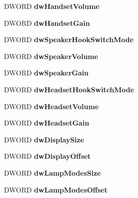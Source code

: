 \begin{DoxyCompactItemize}
D\+W\+O\+RD {\bfseries dw\+Handset\+Volume}
\item 
\mbox{\label{structphonestatus__tag_a398c042812e9722614f518389cfb1e4d}} 
D\+W\+O\+RD {\bfseries dw\+Handset\+Gain}
\item 
\mbox{\label{structphonestatus__tag_a8dbb08eea58c81497d66b5f3d90ec59e}} 
D\+W\+O\+RD {\bfseries dw\+Speaker\+Hook\+Switch\+Mode}
\item 
\mbox{\label{structphonestatus__tag_acf8f261d6d6ee2c2eb272dd4335f390e}} 
D\+W\+O\+RD {\bfseries dw\+Speaker\+Volume}
\item 
\mbox{\label{structphonestatus__tag_aad9ad6ed831f084a2406aa2b0258c2d7}} 
D\+W\+O\+RD {\bfseries dw\+Speaker\+Gain}
\item 
\mbox{\label{structphonestatus__tag_a511fd2e99c6505e14d71962ab4705394}} 
D\+W\+O\+RD {\bfseries dw\+Headset\+Hook\+Switch\+Mode}
\item 
\mbox{\label{structphonestatus__tag_a80bb2c56500c2ea165642dc061b9ac4a}} 
D\+W\+O\+RD {\bfseries dw\+Headset\+Volume}
\item 
\mbox{\label{structphonestatus__tag_a43a1f6471e398787caf1aee107c5b047}} 
D\+W\+O\+RD {\bfseries dw\+Headset\+Gain}
\item 
\mbox{\label{structphonestatus__tag_a5099f3c49b0aaf18fbe089d039efee4f}} 
D\+W\+O\+RD {\bfseries dw\+Display\+Size}
\item 
\mbox{\label{structphonestatus__tag_a10cd1a904884ca6f21ef5b692da6760c}} 
D\+W\+O\+RD {\bfseries dw\+Display\+Offset}
\item 
\mbox{\label{structphonestatus__tag_a49290d9d501ba310e8692fad7440dcc3}} 
D\+W\+O\+RD {\bfseries dw\+Lamp\+Modes\+Size}
\item 
\mbox{\label{structphonestatus__tag_aa936084790cb3c3f91f9ae76ab870490}} 
D\+W\+O\+RD {\bfseries dw\+Lamp\+Modes\+Offset}

\end{DoxyCompactItemize}
